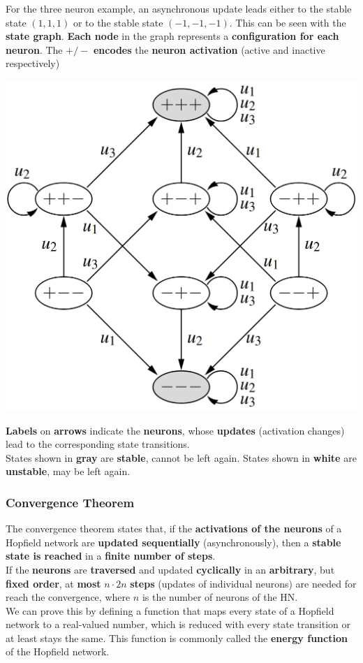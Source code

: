 For the three neuron example, an asynchronous update leads either to the stable state $(1, 1, 1)$ or to the stable state $(-1, -1, -1)$. This can be seen with the \textbf{state graph}. \textbf{Each node} in the graph represents a \textbf{configuration for each neuron}. The $+/-$ \textbf{encodes} the \textbf{neuron activation} (active and inactive respectively)
\begin{center}
	\includegraphics[width=0.6\columnwidth]{img/NN/HN3}
\end{center}
\textbf{Labels} on \textbf{arrows} indicate the \textbf{neurons}, whose \textbf{updates} (activation changes) lead to the corresponding state transitions. \\
States shown in \textbf{gray} are \textbf{stable}, cannot be left again. States shown in \textbf{white} are \textbf{unstable}, may be left again.\\

\newpage

\subsubsection{Convergence Theorem}
The convergence theorem states that, if the \textbf{activations of the neurons} of a Hopfield network are \textbf{updated sequentially} (asynchronously), then a \textbf{stable state is reached} in a \textbf{finite number of steps}.\\
If the \textbf{neurons} are \textbf{traversed} and updated \textbf{cyclically} in an \textbf{arbitrary}, but \textbf{fixed order}, at \textbf{most} $n \cdot 2n$ \textbf{steps} (updates of individual neurons) are needed for reach the convergence, where $n$ is the number of neurons of the HN.\\

We can prove this by defining a function that maps every state of a Hopfield network to a real-valued number, which is reduced with every state transition or at least stays the same. This function is commonly called the \textbf{energy function} of the Hopfield network.\\

